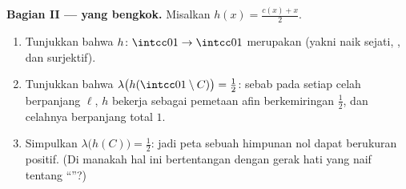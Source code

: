 \begin{problem}
\medskip
\noindent\textbf{Bagian II ---  yang bengkok.} Misalkan
$h(x) = \frac{c(x) + x}{2}$.
\begin{enumerate}[resume]
  \item Tunjukkan bahwa $h \colon \intcc01 \to \intcc01$ merupakan
         (yakni naik sejati, , dan
        surjektif).
  \item Tunjukkan bahwa $\lambda\bigl(h(\intcc01\setminus C)\bigr) =
        \tfrac12$: sebab pada setiap celah berpanjang $\ell$, $h$ bekerja sebagai
        pemetaan afin berkemiringan $\tfrac12$, dan celahnya berpanjang
        total $1$.
  \item Simpulkan $\lambda\bigl(h(C)\bigr) = \tfrac12$: jadi
        peta  sebuah himpunan nol dapat berukuran positif.
        (Di manakah hal ini bertentangan dengan gerak hati yang naif
        tentang ``''?)
\end{enumerate}


\end{problem}
